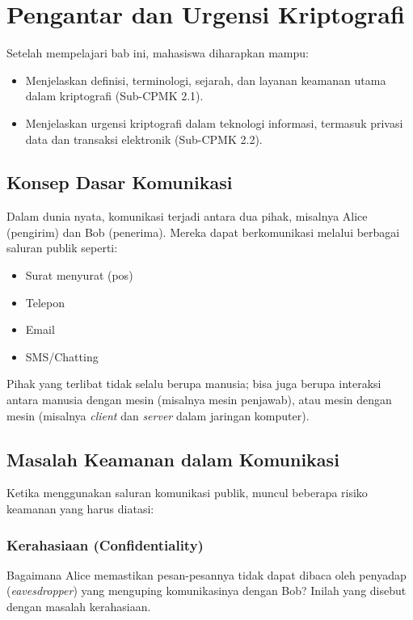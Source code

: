 \documentclass[../main.tex]{subfiles}
\begin{document}
\chapter{Pengantar dan Urgensi Kriptografi}

\begin{learningoutcome}
Setelah mempelajari bab ini, mahasiswa diharapkan mampu:
\begin{itemize}
    \item Menjelaskan definisi, terminologi, sejarah, dan layanan keamanan utama dalam kriptografi (Sub-CPMK 2.1).
    \item Menjelaskan urgensi kriptografi dalam teknologi informasi, termasuk privasi data dan transaksi elektronik (Sub-CPMK 2.2).
\end{itemize}
\end{learningoutcome}

\section{Konsep Dasar Komunikasi}
Dalam dunia nyata, komunikasi terjadi antara dua pihak, misalnya Alice (pengirim) dan Bob (penerima). Mereka dapat berkomunikasi melalui berbagai saluran publik seperti:
\begin{itemize}
    \item Surat menyurat (pos)
    \item Telepon
    \item Email
    \item SMS/Chatting
\end{itemize}
Pihak yang terlibat tidak selalu berupa manusia; bisa juga berupa interaksi antara manusia dengan mesin (misalnya mesin penjawab), atau mesin dengan mesin (misalnya \textit{client} dan \textit{server} dalam jaringan komputer).

\section{Masalah Keamanan dalam Komunikasi}
Ketika menggunakan saluran komunikasi publik, muncul beberapa risiko keamanan yang harus diatasi:

\subsection{Kerahasiaan (Confidentiality)}
Bagaimana Alice memastikan pesan-pesannya tidak dapat dibaca oleh penyadap (\textit{eavesdropper}) yang menguping komunikasinya dengan Bob? Inilah yang disebut dengan masalah kerahasiaan.
\end{document}
